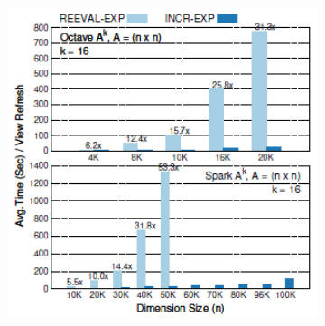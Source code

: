 \begin{figure}[h]
\begin{subfigure}{0.3\textwidth}
        \includegraphics[height = 1.5\textwidth, width=1.2\textwidth]{Figures/linview_matrix_power_exp2.png}
    \caption{}
    \label{fig:linview_matrix_powers2}
    \end{subfigure}
    \hfill
    \begin{subfigure}{0.3\textwidth}

\end{subfigure}
\end{figure}
